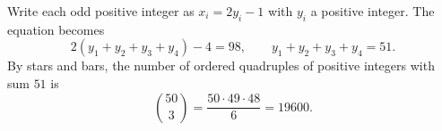 Write each odd positive integer as $x_i=2y_i-1$ with $y_i$ a positive integer. The equation becomes
\[
2(y_1+y_2+y_3+y_4)-4=98,\qquad y_1+y_2+y_3+y_4=51 .
\]
By stars and bars, the number of ordered quadruples of positive integers with sum $51$ is
\[
\binom{50}{3}=\dfrac{50\cdot49\cdot48}{6}=\boxed{19600}.
\]
